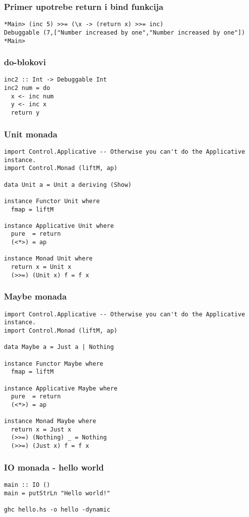 \documentclass{beamer}
\begin{document}
\begin{frame}[fragile]
\frametitle{Primer upotrebe return i bind funkcija}
\begin{lstlisting}
*Main> (inc 5) >>= (\x -> (return x) >>= inc)
Debuggable (7,["Number increased by one","Number increased by one"])
*Main>
\end{lstlisting}
\end{frame}

\begin{frame}[fragile]
\frametitle{do-blokovi}
\begin{lstlisting}
inc2 :: Int -> Debuggable Int 
inc2 num = do 
  x <- inc num
  y <- inc x 
  return y 
\end{lstlisting}
\end{frame}

\begin{frame}[fragile]
\frametitle{Unit monada}
\begin{lstlisting}
import Control.Applicative -- Otherwise you can't do the Applicative instance.
import Control.Monad (liftM, ap)

data Unit a = Unit a deriving (Show)

instance Functor Unit where
  fmap = liftM

instance Applicative Unit where
  pure  = return
  (<*>) = ap

instance Monad Unit where 
  return x = Unit x
  (>>=) (Unit x) f = f x
\end{lstlisting}
\end{frame}

\begin{frame}[fragile]
\frametitle{Maybe monada}
\begin{lstlisting}
import Control.Applicative -- Otherwise you can't do the Applicative instance.
import Control.Monad (liftM, ap)

data Maybe a = Just a | Nothing

instance Functor Maybe where
  fmap = liftM

instance Applicative Maybe where
  pure  = return
  (<*>) = ap

instance Monad Maybe where 
  return x = Just x
  (>>=) (Nothing) _ = Nothing
  (>>=) (Just x) f = f x
\end{lstlisting}
\end{frame}

\begin{frame}[fragile]
\frametitle{IO monada - hello world}
\begin{lstlisting}
main :: IO ()
main = putStrLn "Hello world!" 

ghc hello.hs -o hello -dynamic 

\end{lstlisting}
\end{frame}
\end{document}
